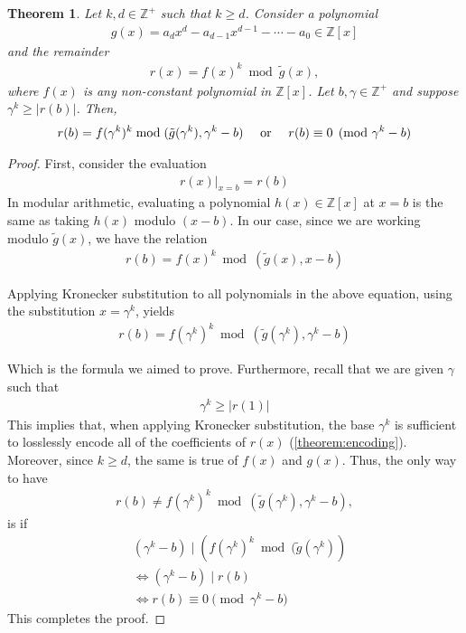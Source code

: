 \documentclass[11pt,reqno]{article}
\theoremstyle{plain}
\newtheorem{theorem}{Theorem}
\theoremstyle{definition}
\newcommand{\eval}[2]{\left . #1 \right|_{#2}}
\begin{document}
\begin{theorem} \label{theorem:kroneckerqrings}
Let $k, d \in \mathbb{Z}^+$ such that $k \geq d$. Consider a polynomial
\begin{align*}
g(x) = a_d x^d - a_{d-1} x^{d-1} - \cdots - a_0 \in \mathbb{Z}[x]
\end{align*}
and the remainder
\begin{align*}
r(x) = f(x)^k  \bmod{\tilde{g}(x)} ,
\end{align*}
where $f(x)$ is any non-constant polynomial in $\mathbb{Z}[x]$. Let $b, \gamma \in \mathbb{Z}^+$ and suppose $\gamma^k \geq |r(b)|$. Then,
\begin{align*}
r(b) = f(\gamma^k)^k \bmod{(\tilde{g}(\gamma^k), \gamma^k - b)}
\quad \textup{ or }
\quad r(b) \equiv 0 \pmod{\gamma^k - b}
\end{align*}

\end{theorem}
\begin{proof}
First, consider the evaluation 
\begin{align*}
    \eval{r(x)}{x=b} = r(b)
\end{align*}
In modular arithmetic, evaluating a polynomial $h(x) \in \mathbb{Z}[x]$ at $x=b$ is the same as taking $h(x)$ modulo $(x - b)$. In our case, since we are working modulo $\tilde{g}(x)$, we have the relation
\begin{align*}
    r(b) = f(x)^k \bmod{(\tilde{g}(x), x - b)}
\end{align*}

Applying Kronecker substitution to all polynomials in the above equation, using the substitution $x = \gamma^k$, yields
\begin{align*}
    r(b) = f(\gamma^k)^k \bmod{(\tilde{g}(\gamma^k), \gamma^k - b)}
\end{align*}

Which is the formula we aimed to prove. Furthermore, recall that we are given $\gamma$ such that
\begin{align*}
    \gamma^k \geq |r(1)|
\end{align*}
This implies that, when applying Kronecker substitution, the base $\gamma^k$ is sufficient to losslessly encode all of the coefficients of $r(x)$ (\cref{theorem:encoding}). Moreover, since $k \geq d$, the same is true of $f(x)$ and $g(x)$. Thus, the only way to have
\begin{align}
    r(b) \not= f(\gamma^k)^k \bmod{(\tilde{g}(\gamma^k), \gamma^k - b)} ,
\end{align}
is if
\begin{align*}
    & (\gamma^k - b) \mid (f(\gamma^k)^k \bmod{(\tilde{g}(\gamma^k)}) \\
    & \Longleftrightarrow (\gamma^k - b) \mid r(b) \\
    & \Longleftrightarrow r(b) \equiv 0 \pmod{\gamma^k - b}
\end{align*}
This completes the proof.
\end{proof}
\end{document}
